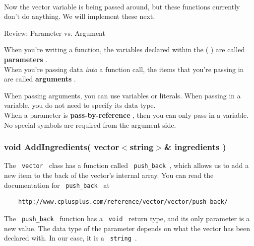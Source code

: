 \documentclass[a4paper,12pt]{book}
\begin{document}
                    ~\\
                    Now the vector variable is being passed around, but
                    these functions currently don't do anything. We will
                    implement these next.

                    \begin{intro}{ Review: Parameter vs. Argument }

                    When you're writing a function, the
                    variables declared within the ( ) are
                    called \textbf{ parameters }. \\

                    When you're passing data \textit{ into }
                    a function call, the items that you're passing in are
                    called \textbf{ arguments }.

                    When passing arguments, you can use variables
                    or literals. When passing in a variable, you
                    do not need to specify its data type. \\

                    When a parameter is \textbf{ pass-by-reference },
                    then you can only pass in a variable. No special
                    symbols are required from the argument side. 
                    \end{intro}


                \hrulefill{}
                \subsubsection*{ void AddIngredients( vector$<$string$>$\& ingredients ) }

                    The \texttt{ vector } class has a function called
                    \texttt{ push\_back }, which allows us to add a
                    new item to the back of the vector's internal array.
                    You can read the documentation for \texttt{ push\_back } at
\begin{verbatim}
    http://www.cplusplus.com/reference/vector/vector/push_back/    
\end{verbatim}

                    The \texttt{ push\_back } function has a \texttt{ void }
                    return type, and its only parameter is a new value.
                    The data type of the parameter depends on what the
                    vector has been declared with. In our case, it is a
                    \texttt{ string }.
\end{document}
